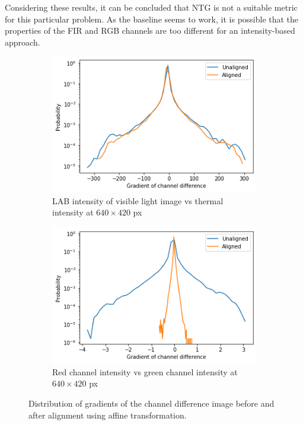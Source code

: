 \documentclass{l4proj}
\begin{document}
Considering these results, it can be concluded that NTG is not a suitable metric for this particular problem. As the baseline seems to work, it is possible that the properties of the FIR and RGB channels are too different for an intensity-based approach.

\begin{figure}[h]
  \centering
  \begin{subfigure}[h!]{0.45\textwidth}
    \includegraphics[width=\textwidth]{images/registration/gradient_distribution.png}
    \caption{LAB intensity of visible light image vs thermal intensity at $640 \times 420$ px}
    \label{fig:gradient_distribution}
  \end{subfigure}
  \begin{subfigure}[h!]{0.45\textwidth}
    \includegraphics[width=\textwidth]{images/registration/gradient_distribution_red_green.png}
    \caption{Red channel intensity vs green channel intensity at $640 \times 420$ px}
    \label{fig:gradient_distribution_red_green}
  \end{subfigure}
  \caption{Distribution of gradients of the channel difference image before and after alignment using affine transformation.}
\end{figure}
\end{document}
